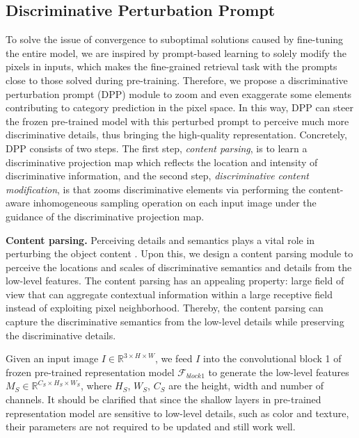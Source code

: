 \documentclass[letterpaper]{article} %
\begin{document}
\subsection{Discriminative Perturbation Prompt}
To solve the issue of convergence to suboptimal solutions caused by fine-tuning the entire model, we are inspired by prompt-based learning to solely modify the pixels in inputs, which makes the fine-grained retrieval task with the prompts close to those solved during pre-training.
Therefore, we propose a discriminative perturbation prompt (DPP) module to zoom and even exaggerate some elements contributing to category prediction in the pixel space. In this way, DPP can steer the frozen pre-trained model with this perturbed prompt to perceive much more discriminative details, thus bringing the high-quality representation.
Concretely, DPP consists of two steps. The first step, \textit{content parsing}, is to learn a discriminative projection map which reflects the location and intensity of discriminative information, and the second step, \textit{discriminative content modification}, is that zooms discriminative elements via performing the content-aware inhomogeneous sampling operation on each input image under the guidance of the discriminative projection map. 

\textbf{Content parsing.} Perceiving details and semantics plays a vital role in perturbing the object content \cite{DBLP:conf/mm/WangWLO20,DBLP:conf/aaai/WangLWO21, DBLP:conf/icmcs/WangWZLL19}. Upon this, we design a content parsing module to perceive the locations and scales of discriminative semantics and details from the low-level features. The content parsing has an appealing property: large field of view that can aggregate contextual information within a large receptive field instead of exploiting pixel neighborhood. Thereby, the content parsing can capture the discriminative semantics from the low-level details while preserving the discriminative details.

 
Given an input image $ I \in \mathbb{R}^{3\times H \times W} $, we  feed $ I $ into the convolutional block 1 of frozen pre-trained representation model $ \mathcal{F}_{block1} $ to generate the low-level features $ M_S \in\mathbb{R}^{C_S \times H_S \times W_S} $, where $ H_S $, $W_S $, $ C_S $ are the height, width and number of channels. It should be clarified that since the shallow layers in pre-trained representation model are sensitive to low-level details, such as color and texture, their parameters are not required to be updated and still work well.
\end{document}
